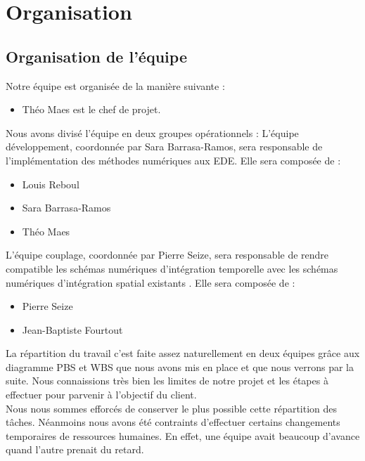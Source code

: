 \documentclass[a4paper,12pt]{report}
\theoremstyle{break}
\begin{document}
\section{Organisation}
\subsection{Organisation de l’équipe}
    Notre équipe est organisée de la manière suivante :
   \begin{itemize}[label=\textbullet]
   	\item Théo Maes est le chef de projet. 
   \end{itemize}
Nous avons divisé l’équipe en deux groupes opérationnels :
L’équipe développement, coordonnée par Sara Barrasa-Ramos, sera responsable de l'implémentation des méthodes numériques aux EDE. Elle sera composée de :
   	    \begin{itemize}[label=\textbullet]
   	    \item Louis Reboul
   	    \item Sara Barrasa-Ramos
   	    \item Théo Maes
        \end{itemize}
        
        L’équipe couplage, coordonnée par Pierre Seize, sera responsable de rendre compatible les schémas numériques d'intégration temporelle avec les schémas numériques d'intégration spatial existants . Elle sera composée de :
   	    \begin{itemize}[label=\textbullet]
   	    \item Pierre Seize
   	    \item Jean-Baptiste Fourtout
        \end{itemize}
        
La répartition du travail c'est faite assez naturellement en deux équipes grâce aux diagramme PBS et WBS que nous avons mis en place et que nous verrons par la suite. Nous connaissions très bien les limites de notre projet et les étapes à effectuer pour parvenir à l'objectif du client.       \\ Nous nous sommes efforcés de conserver le plus possible cette répartition des tâches. Néanmoins nous avons été contraints d'effectuer certains changements temporaires de ressources humaines. En effet, une équipe avait beaucoup d'avance quand l'autre prenait du retard.
    
\end{document}

